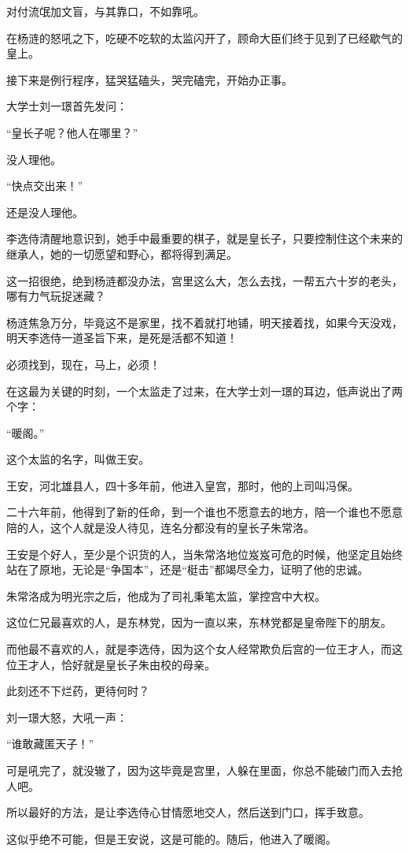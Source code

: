 \begin{multicols}{\theparacolNo}
对付流氓加文盲，与其靠口，不如靠吼。

在杨涟的怒吼之下，吃硬不吃软的太监闪开了，顾命大臣们终于见到了已经歇气的皇上。

接下来是例行程序，猛哭猛磕头，哭完磕完，开始办正事。

大学士刘一璟首先发问：

“皇长子呢？他人在哪里？”

没人理他。

“快点交出来！”

还是没人理他。

李选侍清醒地意识到，她手中最重要的棋子，就是皇长子，只要控制住这个未来的继承人，她的一切愿望和野心，都将得到满足。

这一招很绝，绝到杨涟都没办法，宫里这么大，怎么去找，一帮五六十岁的老头，哪有力气玩捉迷藏？

杨涟焦急万分，毕竟这不是家里，找不着就打地铺，明天接着找，如果今天没戏，明天李选侍一道圣旨下来，是死是活都不知道！

必须找到，现在，马上，必须！

在这最为关键的时刻，一个太监走了过来，在大学士刘一璟的耳边，低声说出了两个字：

“暖阁。”

这个太监的名字，叫做王安。

王安，河北雄县人，四十多年前，他进入皇宫，那时，他的上司叫冯保。

二十六年前，他得到了新的任命，到一个谁也不愿意去的地方，陪一个谁也不愿意陪的人，这个人就是没人待见，连名分都没有的皇长子朱常洛。

王安是个好人，至少是个识货的人，当朱常洛地位岌岌可危的时候，他坚定且始终站在了原地，无论是“争国本”，还是“梃击”都竭尽全力，证明了他的忠诚。

朱常洛成为明光宗之后，他成为了司礼秉笔太监，掌控宫中大权。

这位仁兄最喜欢的人，是东林党，因为一直以来，东林党都是皇帝陛下的朋友。

而他最不喜欢的人，就是李选侍，因为这个女人经常欺负后宫的一位王才人，而这位王才人，恰好就是皇长子朱由校的母亲。

此刻还不下烂药，更待何时？

刘一璟大怒，大吼一声：

“谁敢藏匿天子！”

可是吼完了，就没辙了，因为这毕竟是宫里，人躲在里面，你总不能破门而入去抢人吧。

所以最好的方法，是让李选侍心甘情愿地交人，然后送到门口，挥手致意。

这似乎绝不可能，但是王安说，这是可能的。随后，他进入了暖阁。


\end{multicols}
